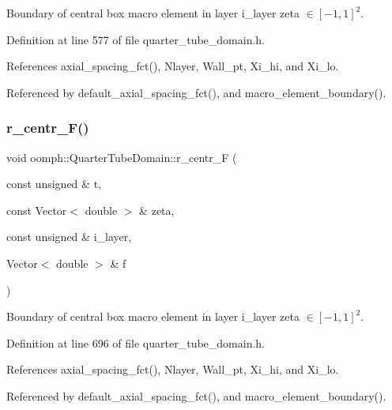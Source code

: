 Boundary of central box macro element in layer i\+\_\+layer zeta $ \in [-1,1]^2 $. 



Definition at line 577 of file quarter\+\_\+tube\+\_\+domain.\+h.



References axial\+\_\+spacing\+\_\+fct(), Nlayer, Wall\+\_\+pt, Xi\+\_\+hi, and Xi\+\_\+lo.



Referenced by default\+\_\+axial\+\_\+spacing\+\_\+fct(), and macro\+\_\+element\+\_\+boundary().

\mbox{\label{classoomph_1_1QuarterTubeDomain_ace2c74d570fcb6a1ddf7a045ab3975c6}} 
\subsubsection{\texorpdfstring{r\+\_\+centr\+\_\+\+F()}{r\_centr\_F()}}
{\footnotesize\ttfamily void oomph\+::\+Quarter\+Tube\+Domain\+::r\+\_\+centr\+\_\+F (\begin{DoxyParamCaption}\item[{const unsigned \&}]{t,  }\item[{const Vector$<$ double $>$ \&}]{zeta,  }\item[{const unsigned \&}]{i\+\_\+layer,  }\item[{Vector$<$ double $>$ \&}]{f }\end{DoxyParamCaption})\hspace{0.3cm}{\ttfamily [private]}}



Boundary of central box macro element in layer i\+\_\+layer zeta $ \in [-1,1]^2 $. 



Definition at line 696 of file quarter\+\_\+tube\+\_\+domain.\+h.



References axial\+\_\+spacing\+\_\+fct(), Nlayer, Wall\+\_\+pt, Xi\+\_\+hi, and Xi\+\_\+lo.



Referenced by default\+\_\+axial\+\_\+spacing\+\_\+fct(), and macro\+\_\+element\+\_\+boundary().

\mbox{\label{classoomph_1_1QuarterTubeDomain_ad150b2df8858d3936e7b6fb856de7ce1}} 
